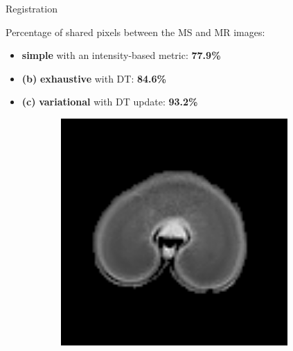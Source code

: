 \documentclass[10pt]{beamer}
\begin{document}
\begin{frame}{Registration}

  \vspace{-0.3cm}
  Percentage of shared pixels between the MS and MR images:
  \begin{itemize}
  \item \textbf{simple} with an intensity-based metric: \textbf{77.9\%}
  \item \textbf{(b)} \textbf{exhaustive} with DT: \textbf{84.6\%}
  \item \textbf{(c)} \textbf{variational} with DT update: \textbf{93.2\%}
  \end{itemize}

  \begin{figure}[ht]
  \centering
  \begin{subfigure}[t]{0.25\textwidth}
    \centering
    \includegraphics[width=0.95\textwidth]{fig/registration_wheat_mri}
    \caption{}
    \label{subfig:registration_wheat_mri}
  \end{subfigure}%
  \begin{subfigure}[t]{0.25\textwidth}
    \centering

\end{subfigure}
\end{figure}
\end{frame}
\end{document}
